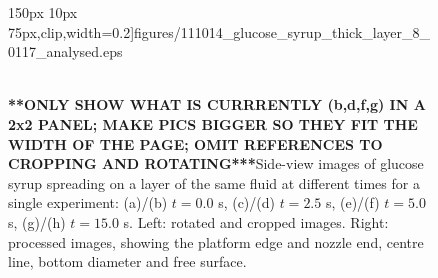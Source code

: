 \documentclass[aip,graphicx]{revtex4-1}
\begin{document}
\begin{figure}[!ht]
{{       150px 10px
       75px},clip,width=0.2\textwidth]{figures/111014_glucose_syrup_thick_layer_8_0117_analysed.eps}}
 \\  \hspace{0.5cm}
 \\  \hspace{0.5cm}
  \caption{{\bf ***ONLY SHOW WHAT IS CURRRENTLY (b,d,f,g) IN A 2x2
      PANEL; MAKE PICS BIGGER SO THEY FIT THE WIDTH OF THE PAGE; OMIT
      REFERENCES TO CROPPING AND ROTATING***}Side-view images of glucose syrup spreading on a layer of
    the same fluid at different times for a single experiment: (a)/(b)
    $t=0.0$ s, (c)/(d) $t=2.5$ s, (e)/(f) $t=5.0$ s, (g)/(h) $t=15.0$
    s. Left: rotated and cropped images. Right: processed images,
    showing the platform edge and nozzle end, centre line, bottom
    diameter and free surface.\label{fig:glucose_spreading}}
\end{figure}
\end{document}
